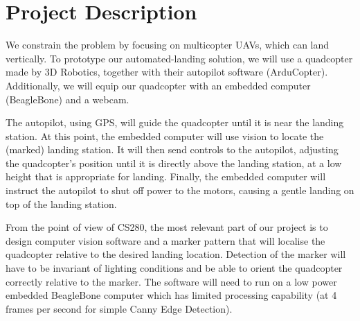 \section*{Project Description}

We constrain the problem by focusing on multicopter UAVs, which can land
vertically. To prototype our automated-landing solution, we will use a
quadcopter made by 3D Robotics, together with their autopilot software
(ArduCopter). Additionally, we will equip our quadcopter with an embedded
computer (BeagleBone) and a webcam.

The autopilot, using GPS, will guide the quadcopter until it is near the
landing station. At this point, the embedded computer will use vision to locate
the (marked) landing station. It will then send controls to the autopilot,
adjusting the quadcopter's position until it is directly above the landing
station, at a low height that is appropriate for landing. Finally, the embedded
computer will instruct the autopilot to shut off power to the motors, causing a
gentle landing on top of the landing station.

From the point of view of CS280, the most relevant part of our project is to
design computer vision software and a marker pattern that will localise the quadcopter relative to the desired landing location. Detection of the marker will have to be invariant of lighting conditions and be able to orient the quadcopter correctly relative to the marker. The software will need to run on a low power embedded BeagleBone computer which has limited processing capability (at 4 frames per second for simple Canny Edge Detection).